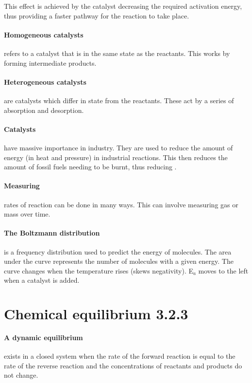 	This effect is achieved by the catalyst decreasing the required activation energy, thus providing a faster pathway for the reaction to take place.
	
	\paragraph{Homogeneous catalysts} refers to a catalyst that is in the same state as the reactants.
	This works by forming intermediate products.
	
	\paragraph{Heterogeneous catalysts} are catalysts which differ in state from the reactants.
	These act by a series of absorption and desorption.
	
	\paragraph{Catalysts} have massive importance in industry.
	They are used to reduce the amount of energy (in heat and pressure) in industrial reactions.
	This then reduces the amount of fossil fuels needing to be burnt, thus reducing .
	
	\paragraph{Measuring} rates of reaction can be done in many ways. This can involve measuring gas or mass over time.
	
	\paragraph{The Boltzmann distribution} is a frequency distribution used to predict the energy of molecules.
	The area under the curve represents the number of molecules with a given energy.
	The curve changes when the temperature rises (skews negativity). E$_a$ moves to the left when a catalyst is added.
	
\section{Chemical equilibrium 3.2.3}

	\paragraph{A dynamic equilibrium} exists in a closed system when the rate of the forward reaction is equal to the rate of the reverse reaction and the concentrations of reactants and products do not change.
	
